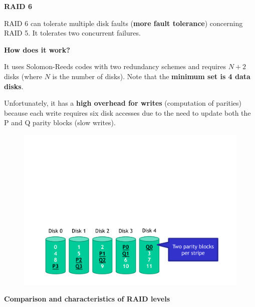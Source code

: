 \longline

\begin{center}\label{RAID 6}
    \large
    \hypertarget{RAID 6}{\textcolor{Red2}{\textbf{RAID 6}}}
\end{center}
RAID 6 can tolerate multiple disk faults (\textbf{more fault tolerance}) concerning RAID 5. It tolerates two concurrent failures.

\highspace
\begin{flushleft}
    \textcolor{Green3}{ \textbf{How does it work?}}
\end{flushleft}
It uses Solomon-Reeds codes with two redundancy schemes and requires $N + 2$ disks (where $N$ is the number of disks). Note that the \textbf{minimum set is 4 data disks}.

Unfortunately, it has a \textbf{high overhead for writes} (computation of parities) because each write requires six disk accesses due to the need to update both the P and Q parity blocks (slow writes).

\begin{figure}[!htp]
    \centering
    \includegraphics[width=\textwidth]{img/raid-010.pdf}
\end{figure}

\newpage

\begin{center}\label{Comparison and characteristics of RAID levels}
    \large
    \hypertarget{Comparison and characteristics of RAID levels}{\textcolor{Red2}{\textbf{Comparison and characteristics of RAID levels}}}
\end{center}

